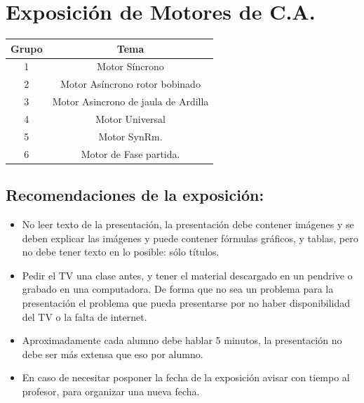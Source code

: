 \documentclass[../main]{subfiles}
\begin{document}
\section{Exposición de Motores de C.A.}
\begin{center}
\end{center}
\begin{table}
  \centering
  \begin{tabular}{|c|c|} \hline
    Grupo  & Tema  \\ \hline \hline
    1 &Motor Síncrono \\ \hline
    2& Motor Asíncrono rotor bobinado \\ \hline
    3& Motor Asincrono de jaula de Ardilla \\ \hline
    4 &Motor Universal\\ \hline
    5 &Motor SynRm. \\ \hline
    6& Motor de Fase partida. \\ \hline
  \end{tabular}
\end{table}
\subsection{Recomendaciones de la exposición:}
\begin{itemize}
  \item No leer texto de la presentación, la presentación debe
    contener imágenes y se deben explicar las imágenes y puede
    contener fórmulas gráficos, y tablas, pero no debe tener texto en
    lo posible: sólo títulos.
  \item Pedir el TV una clase antes, y tener el material descargado
    en un pendrive o grabado en una computadora. De forma que no sea
    un problema para la presentación el problema que pueda
    presentarse por no haber disponibilidad del TV o la falta de internet.
  \item Aproximadamente cada alumno debe hablar 5 minutos, la
    presentación no debe ser más extensa que eso por alumno.
  \item En caso de necesitar posponer la fecha de la exposición
    avisar con tiempo al profesor, para organizar una nueva fecha.
\end{itemize}
\end{document}
